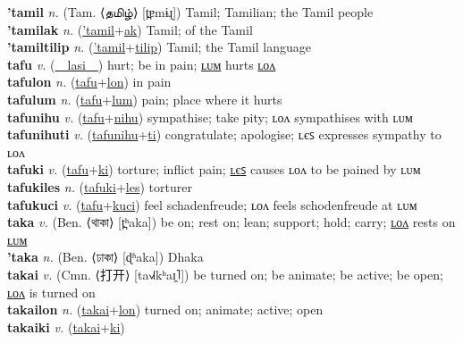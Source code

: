 \textbf{'tamil} \textit{n.} (Tam. ⟨தமிழ்⟩ [t̪ɐmɨɻ])
Tamil; Tamilian; the Tamil people \label{'tamil} \\
\textbf{'tamilak} \textit{n.} (\hyperref['tamil]{'tamil}+\hyperref[ak]{ak})
Tamil; of the Tamil \label{'tamilak} \\
\textbf{'tamiltilip} \textit{n.} (\hyperref['tamil]{'tamil}+\hyperref[tilip]{tilip})
Tamil; the Tamil language \label{'tamiltilip} \\
\textbf{tafu} \textit{v.} (\hyperref[lasi]{~~lasi~~})
hurt; be in pain; \hyperref[tafulum]{ʟᴜᴍ} hurts \hyperref[tafulon]{ʟᴏᴧ} \label{tafu} \\
\textbf{tafulon} \textit{n.} (\hyperref[tafu]{tafu}+\hyperref[lon]{lon})
in pain \label{tafulon} \\
\textbf{tafulum} \textit{n.} (\hyperref[tafu]{tafu}+\hyperref[lum]{lum})
pain; place where it hurts \label{tafulum} \\
\textbf{tafunihu} \textit{v.} (\hyperref[tafu]{tafu}+\hyperref[nihu]{nihu})
sympathise; take pity; ʟᴏᴧ sympathises with ʟᴜᴍ \label{tafunihu} \\
\textbf{tafunihuti} \textit{v.} (\hyperref[tafunihu]{tafunihu}+\hyperref[ti]{ti})
congratulate; apologise; ʟєꜱ expresses sympathy to ʟᴏᴧ \label{tafunihuti} \\
\textbf{tafuki} \textit{v.} (\hyperref[tafu]{tafu}+\hyperref[ki]{ki})
torture; inflict pain; \hyperref[tafukiles]{ʟєꜱ} causes ʟᴏᴧ to be pained by ʟᴜᴍ \label{tafuki} \\
\textbf{tafukiles} \textit{n.} (\hyperref[tafuki]{tafuki}+\hyperref[les]{les})
torturer \label{tafukiles} \\
\textbf{tafukuci} \textit{v.} (\hyperref[tafu]{tafu}+\hyperref[kuci]{kuci})
feel schadenfreude; ʟᴏᴧ feels schodenfreude at ʟᴜᴍ \label{tafukuci} \\
\textbf{taka} \textit{v.} (Ben. ⟨থাকা⟩ [t̪ʰaka])
be on; rest on; lean; support; hold; carry; \hyperref[takalon]{ʟᴏᴧ} rests on \hyperref[takalum]{ʟᴜᴍ} \label{taka} \\
\textbf{'taka} \textit{n.} (Ben. ⟨ঢাকা⟩ [ɖʱaka])
Dhaka \label{'taka} \\
\textbf{takai} \textit{v.} (Cmn. ⟨打开⟩ [ta˧˩˧kʰaɪ̯˥])
be turned on; be animate; be active; be open; \hyperref[takailon]{ʟᴏᴧ} is turned on \label{takai} \\
\textbf{takailon} \textit{n.} (\hyperref[takai]{takai}+\hyperref[lon]{lon})
turned on; animate; active; open \label{takailon} \\
\textbf{takaiki} \textit{v.} (\hyperref[takai]{takai}+\hyperref[ki]{ki})
